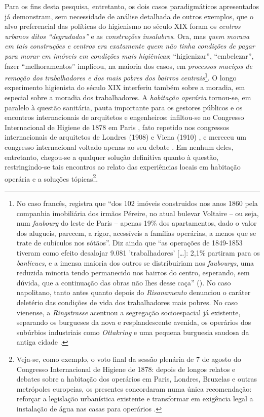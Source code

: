 Para os fins desta pesquisa, entretanto, os dois casos paradigmáticos apresentados já demonstram, sem necessidade de análise detalhada de outros exemplos, que o alvo preferencial das políticas do higienismo no século XIX foram os \textit{centros urbanos ditos ``degradados''} e as \textit{construções insalubres}. Ora, mas \textit{quem morava em tais construções e centros era exatamente quem não tinha condições de pagar para morar em imóveis em condições mais higiênicas}; ``higienizar'', ``embelezar'', fazer ``melhoramentos'' implicou, na maioria dos casos, em \textit{processos maciços de remoção dos trabalhadores e dos mais pobres dos bairros centrais}\footnote{No caso francês,  registra que ``dos 102 imóveis construidos nos anos 1860 pela companhia imobiliária dos irmãos Péreire, no atual bulevar Voltaire -- ou seja, num \textit{faubourg} do leste de Paris -- apenas 19\% dos apartamentos, dado o valor dos alugueis, parecem, a rigor, acessíveis a famílias operárias, a menos que se trate de cubículos nos sótãos''. Diz ainda que ``as operações de 1849-1853 tiveram como efeito desalojar 9.081 'trabalhadores' [\dots]: 2,1\% partiram para os \textit{banlieues}, e a imensa maioria dos outros se distribuiriam nos \textit{faubourgs}, uma reduzida minoria tendo permanecido nos bairros do centro, esperando, sem dúvida, que a continuação das obras não lhes desse caça'' (). No caso napolitano, tanto antes quanto depois do \textit{Risanamento}  denunciou o caráter deletério das condições de vida dos trabalhadores mais pobres. No caso vienense, a \textit{Ringstrasse} acentuou a segregação socioespacial já existente, separando os burgueses da nova e resplandescente avenida, os operários dos subúrbios industriais como \textit{Ottakring} e uma pequena burguesia saudosa da antiga cidade \cite[p.~26]{maderthanermuser_vienna_2003}.}. O longo experimento higienista do século XIX interferiu também sobre a moradia, em especial sobre a moradia dos trabalhadores. A \textit{habitação operária} tornou-se, em paralelo à questão sanitária, pauta importante para os gestores públicos e os encontros internacionais de arquitetos e engenheiros: infiltou-se no Congresso Internacional de Higiene de 1878 em Paris \cite{congres_hygiene_1878}, fato repetido nos congressos internacionais de arquitetos de Londres (1908) e Viena (1910) \cite{QUINTOJR1990}, e mereceu um congresso internacional voltado apenas ao seu debate \cite{fleming_housing_1897}. Em nenhum deles, entretanto, chegou-se a qualquer solução definitiva quanto à questão, restringindo-se tais encontros ao relato das experiências locais em habitação operária e a soluções tópicas\footnote{Veja-se, como exemplo, o voto final da sessão plenária de 7 de agosto do Congresso Internacional de Higiene de 1878: depois de longos relatos e debates sobre a habitação dos operários em Paris, Londres, Bruxelas e outras metrópoles europeias, os presentes concordaram numa única recomendação: reforçar a legislação urbanística existente e transformar em exigência legal a instalação de água nas casas para operários \cite[p.~597]{congres_hygiene_1878}.}.


